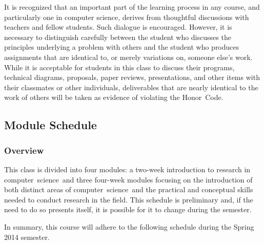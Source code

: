 \noindent It is recognized that an important part of the learning process in any course, and particularly one in
computer science, derives from thoughtful discussions with teachers and fellow students.  Such dialogue is encouraged.
However, it is necessary to distinguish carefully between the student who discusses the principles underlying a problem
with others and the student who produces assignments that are identical to, or merely variations on, someone else's
work.  While it is acceptable for students in this class to discuss their programs, technical diagrams, proposals, paper
reviews, presentations, and other items with their classmates or other individuals, deliverables that are nearly
identical to the work of others will be taken as evidence of violating the \mbox{Honor Code}.

\vspace{-.20in}
\subsection*{Module Schedule}

\subsubsection*{Overview}

This class is divided into four modules: a two-week introduction to research in \mbox{computer science and} three
four-week modules focusing on the introduction of both distinct areas of \mbox{computer science and} the practical and
conceptual skills needed to conduct research in the field.  This schedule is preliminary and, if the need to do so
presents itself, it is possible for it to change during the semester.

\noindent
In summary, this course will adhere to the following schedule during the Spring 2014 semester.

